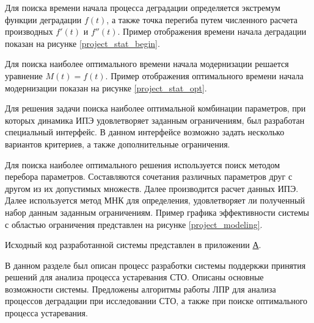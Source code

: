 Для поиска времени начала процесса деградации определяется экстремум функции деградации $f(t)$, 
а также точка перегиба путем численного расчета производных $f'(t)$ и $f''(t)$.
Пример отображения времени начала деградации показан на рисунке \ref{project_stat_begin}.


Для поиска наиболее оптимального времени начала модернизации решается уравнение $M(t)=f(t)$. 
Пример отображения оптимального времени начала модернизации показан на рисунке \ref{project_stat_opt}.

 
Для решения задачи поиска наиболее оптимальной комбинации параметров, при которых динамика ИПЭ удовлетворяет заданным ограничениям, был разработан специальный интерфейс. 
В данном интерфейсе возможно задать несколько вариантов критериев, а также дополнительные ограничения.

Для поиска наиболее оптимального решения используется поиск методом перебора параметров. 
Составляются сочетания различных параметров друг с другом из их допустимых множеств. 
Далее производится расчет данных ИПЭ. 
Далее используется метод МНК для определения, удовлетворяет ли полученный набор данным заданным ограничениям.
Пример графика эффективности системы с областью ограничения представлен на рисунке \ref{project_modeling}.


Исходный код разработанной системы представлен в приложении \hyperlink{app-a}{А}.

В данном разделе был описан процесс разработки системы поддеркжи принятия решений для анализа процесса устаревания СТО.
Описаны основные возможности системы. 
Предложены алгоритмы работы ЛПР для анализа процессов деградации при исследовании СТО, а также при поиске оптимального процесса устаревания.



